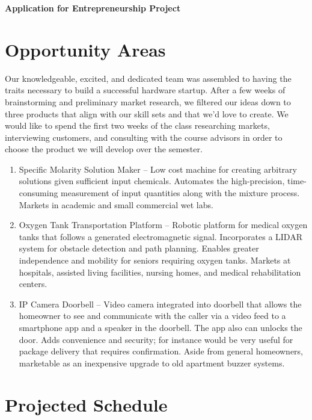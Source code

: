 \documentclass[8pt]{article}
\begin{document}
\begin{center}
\LARGE{\textbf{Application for Entrepreneurship Project}}
\end{center}

\section*{Opportunity Areas}
Our knowledgeable, excited, and dedicated team was assembled to having the
traits necessary to build a successful hardware startup. After a few weeks of
brainstorming and preliminary market research, we filtered our ideas down to
three products that align with our skill sets and that we'd love to create. We would
like to spend the first two weeks of the class researching markets, interviewing
customers, and consulting with the course advisors in order to choose the
product we will develop over the semester.

\begin{enumerate}
\item Specific Molarity Solution Maker -- Low cost machine for creating
  arbitrary solutions given sufficient input chemicals. Automates the
  high-precision, time-consuming measurement of input quantities along with the
  mixture process. Markets in academic and small commercial wet labs.
\item Oxygen Tank Transportation Platform -- Robotic platform for medical oxygen
  tanks that follows a generated electromagnetic signal. Incorporates a LIDAR
  system for obstacle detection and path planning. Enables greater independence
  and mobility for seniors requiring oxygen tanks. Markets at hospitals,
  assisted living facilities, nursing homes, and medical rehabilitation centers.
\item IP Camera Doorbell -- Video camera integrated into doorbell that allows
  the homeowner to see and communicate with the caller via a video feed to a
  smartphone app and a speaker in the doorbell. The app also can unlocks the
  door. Adds convenience and security; for instance would be very useful for
  package delivery that requires confirmation. Aside from general homeowners,
  marketable as an inexpensive upgrade to old apartment buzzer systems.
\end{enumerate}


\section*{Projected Schedule}
\end{document}
